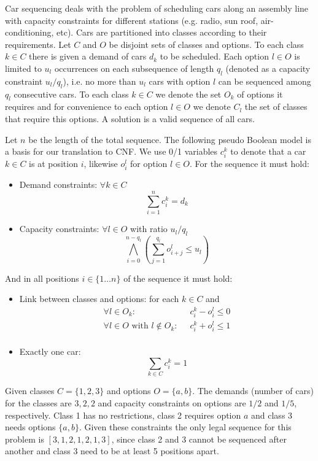 \documentclass[]{llncs}
\begin{document}
Car sequencing deals with the problem of scheduling cars along an assembly line with capacity constraints for different
stations (e.g. radio, sun roof, air-conditioning, etc). Cars are partitioned into classes according to their
requirements. Let $C$ and $O$ be disjoint sets of classes and options. To each class $k\in C$ there is given a demand of
cars $d_k$ to be scheduled. Each option $l\in O$ is limited to $u_l$ occurrences on each subsequence of length $q_l$
(denoted as a capacity constraint $u_l/q_l$), i.e.  no more than $u_l$ cars with option $l$ can be sequenced among $q_l$
consecutive cars. To each class $k\in C$ we denote the set $O_k$ of options it requires and for convenience to each
option $l\in O$ we denote $C_l$ the set of classes that require this options. A solution is a valid sequence of all
cars. 

Let $n$ be the length of the total sequence. The following pseudo Boolean model is a basis for our translation to CNF.
We use 0/1 variables $c^k_i$ to denote that a car $k\in C$ is at position $i$, likewise $o^l_i$ for option $l\in O$. For
the sequence it must hold: 

\begin{itemize}
    \item Demand constraints: $\forall k \in C$ $$\sum^n_{i=1} c^k_i = d_k$$                       
    \item Capacity constraints: $\forall l \in O$ with ratio $u_l/q_l$ $$\bigwedge_{i=0}^{n-q_l}(\sum_{j=1}^{q_l} o^l_{i+j} \leq u_l )$$
\end{itemize}
        And in all positions $i \in \{1\ldots n\}$ of the sequence it must hold:                                                    
\begin{itemize}
    \item Link between classes and options: for each $k\in C$ and 
        \begin{align*}
            \forall l \in O_k :\;\; & c^k_i - o^l_i \leq 0 \\
            \forall l \in O \text{ with } l \not \in O_k :\;\; &c^k_i + o^l_i \leq 1\\
        \end{align*}
    \item Exactly one car:  $$\sum_{k\in C} c^k_i = 1$$  
\end{itemize}

\begin{example} 
    Given classes $C = \{1,2,3\}$ and options $O = \{a,b\}$. The demands (number of cars) for the classes are $3,2,2$
    and capacity constraints on options are $1/2$ and $1/5$, respectively. Class 1 has no restrictions, class 2 requires
    option $a$ and class 3 needs options $\{a, b\}$. Given these constraints the only legal sequence for this problem is
    $[3,1,2,1,2,1,3]$, since class 2 and 3 cannot be sequenced after another and class 3 need to be at least 5 positions
    apart.
\end{example}                                     
\end{document}
